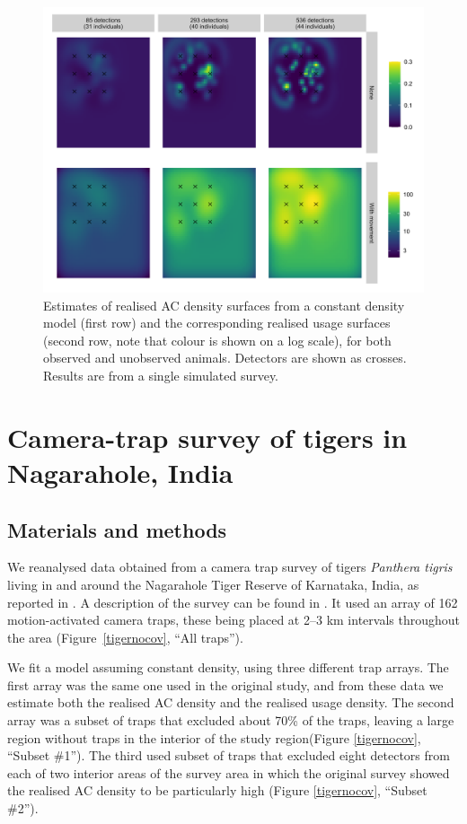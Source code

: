 \documentclass[10pt,a4paper]{article}
\begin{document}
\begin{figure}[htbp]
\centering
\includegraphics[width=1\textwidth]{mona_with_movement.png}
\caption{Estimates of realised AC density surfaces from a constant density model (first row) and the corresponding realised usage surfaces (second row, note that colour is shown on a log scale), for both observed and unobserved animals. Detectors are shown as crosses. Results are from a single simulated survey.}
\label{move}
\end{figure}

\section{Camera-trap survey of tigers in Nagarahole, India}

\subsection{Materials and methods}
We reanalysed data obtained from a camera trap survey of tigers {\it Panthera tigris} living in and around the Nagarahole Tiger Reserve of Karnataka, India, as reported in \cite{Dorazio+Karanth:17}. A description of the survey can be found in  \cite{Dorazio+Karanth:17}. It used an array of 162 motion-activated camera traps, these being placed at 2–3 km intervals throughout the area (Figure~\ref{tigernocov}, ``All traps''). 

We fit a model assuming constant density, using three different trap arrays. The first array was the same one used in the original study, and from these data we estimate both the realised AC density and the realised usage density. The second array was a subset of traps that excluded about 70\% of the traps, leaving a large region without traps in the interior of the study region(Figure \ref{tigernocov}, ``Subset \#1''). The third used subset of traps that excluded eight detectors from each of two interior areas of the survey area in which the original survey showed the realised AC density to be particularly high (Figure \ref{tigernocov}, ``Subset \#2''). 
\end{document}
